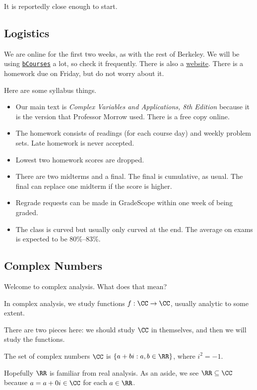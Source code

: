 
It is reportedly close enough to start.

\subsection{Logistics}
We are online for the first two weeks, as with the rest of Berkeley. We will be using \href{https://bcourses.berkeley.edu/courses/1511845}{\texttt{bCourses}} a lot, so check it frequently. There is also a \href{https://sites.google.com/view/ucb-math185-005-spring2022/home}{website}. There is a homework due on Friday, but do not worry about it.

Here are some syllabus things.
\begin{itemize}
	\item Our main text is \textit{Complex Variables and Applications, 8th Edition} because it is the version that Professor Morrow used. There is a free copy online.
	\item The homework consists of readings (for each course day) and weekly problem sets. Late homework is never accepted.
	\item Lowest two homework scores are dropped.
	\item There are two midterms and a final. The final is cumulative, as usual. The final can replace one midterm if the score is higher.
	\item Regrade requests can be made in GradeScope within one week of being graded.
	\item The class is curved but usually only curved at the end. The average on exams is expected to be 80\%--83\%.
\end{itemize}

\subsection{Complex Numbers}
Welcome to complex analysis. What does that mean?
\begin{idea}
	In complex analysis, we study functions $f:\CC\to\CC$, usually analytic to some extent.
\end{idea}
There are two pieces here: we should study $\CC$ in themselves, and then we will study the functions.
\begin{definition}
	The set of complex numbers $\CC$ is $\{a+bi:a,b\in\RR\}$, where $i^2=-1$.
\end{definition}
\noindent Hopefully $\RR$ is familiar from real analysis. As an aside, we see $\RR\subseteq\CC$ because $a=a+0i\in\CC$ for each $a\in\RR$.

